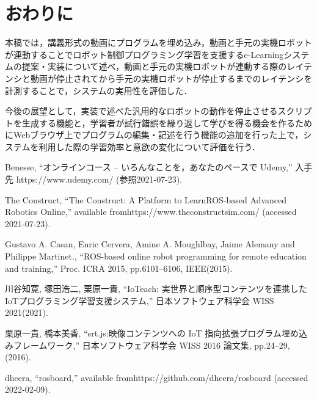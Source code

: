 \documentclass{ujarticle}
\begin{document}
\section{おわりに}
本稿では，講義形式の動画にプログラムを埋め込み，動画と手元の実機ロボットが連動することでロボット制御プログラミング学習を支援するe-Learningシステムの提案・実装について述べ，動画と手元の実機ロボットが連動する際のレイテンシと動画が停止されてから手元の実機ロボットが停止するまでのレイテンシを計測することで，システムの実用性を評価した．
\par 今後の展望として，実装で述べた汎用的なロボットの動作を停止させるスクリプトを生成する機能と，学習者が試行錯誤を繰り返して学びを得る機会を作るためにWebブラウザ上でプログラムの編集・記述を行う機能の追加を行った上で，システムを利用した際の学習効率と意欲の変化について評価を行う．



\footnotesize
\begin{thebibliography}{99}
Benesse, ``オンラインコース -- いろんなことを，あなたのペースで \textbar Udemy,'' 入手先 https://www.udemy.com/ (参照2021-07-23).

The Construct, ``The Construct: A Platform to Learn\newline ROS-based Advanced Robotics Online,'' available from\newline https://www.theconstructsim.com/ (accessed 2021-07-23).

Gustavo A. Casan, Enric Cervera, Amine A. Moughlbay, Jaime Alemany and Philippe Martinet., ``ROS-based online robot programming for remote education and training,'' Proc. ICRA 2015, pp.6101--6106, IEEE(2015).

川谷知寛, 塚田浩二, 栗原一貴, ``IoTeach: 実世界と順序型コンテンツを連携したIoTプログラミング学習支援システム,'' 日本ソフトウェア科学会 WISS 2021(2021).

栗原一貴, 橋本美香, ``srt.js:映像コンテンツへの IoT 指向拡張プログラム埋め込みフレームワーク,'' 日本ソフトウェア科学会 WISS 2016 論文集, pp.24--29, (2016).

dheera, ``rosboard,'' available from\newline https://github.com/dheera/rosboard (accessed 2022-02-09).

\end{thebibliography}

\normalsize
\end{document}
